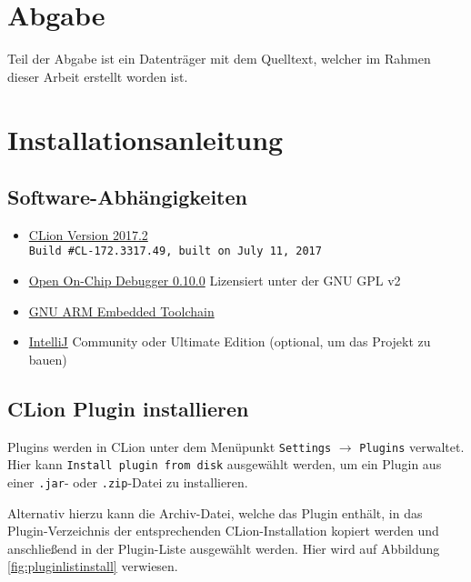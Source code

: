 \appendix
\section{Abgabe}
    Teil der Abgabe ist ein Datenträger mit dem Quelltext, welcher im Rahmen dieser Arbeit erstellt worden ist.
\section{Installationsanleitung}
    \subsection{Software-Abhängigkeiten}
    \begin{itemize}
        \item \href{https://www.jetbrains.com/clion/}{CLion Version 2017.2}\\
        \texttt{Build \#CL-172.3317.49, built on July 11, 2017}
        \item \href{http://openocd.org/}{Open On-Chip Debugger 0.10.0} Lizensiert unter der GNU GPL v2
        \item \href{https://developer.arm.com/open-source/gnu-toolchain/gnu-rm}{GNU ARM Embedded Toolchain}
        \item \href{https://www.jetbrains.com/idea/}{IntelliJ} Community oder Ultimate Edition (optional, um das
        Projekt zu bauen)
    \end{itemize}

    \subsection{CLion Plugin installieren}
    Plugins werden in CLion unter dem Menüpunkt \texttt{Settings} $\rightarrow$ \texttt{Plugins}
    verwaltet. Hier kann \texttt{Install plugin from disk} ausgewählt werden, um ein Plugin aus einer \texttt{.jar}-
    oder \texttt{.zip}-Datei zu installieren.

    Alternativ hierzu kann die Archiv-Datei, welche das Plugin enthält, in das Plugin-Verzeichnis der entsprechenden
    CLion-Installation kopiert werden und anschließend in der Plugin-Liste ausgewählt werden. Hier wird auf Abbildung
    \ref{fig:pluginlistinstall} verwiesen.

